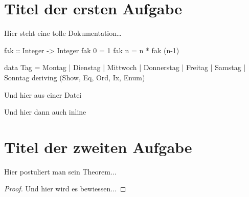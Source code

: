 \documentclass{pi3}
\begin{document}
\maketitle

\section{Titel der ersten Aufgabe}
Hier steht eine tolle Dokumentation\dots
\begin{code}
fak :: Integer -> Integer
fak 0 = 1
fak n = n * fak (n-1)
\end{code}

\begin{xcode}
data Tag = Montag | Dienstag | Mittwoch | Donnerstag | Freitag | Samstag | Sonntag
             deriving (Show, Eq, Ord, Ix, Enum)
\end{xcode}

Und hier aus einer Datei

Und hier dann auch inline

\section{Titel der zweiten Aufgabe}
\begin{theorem}
Hier postuliert man sein Theorem...
\end{theorem}

\begin{proof}
Und hier wird es bewiessen...
\end{proof}
\end{document}
